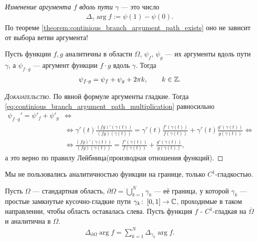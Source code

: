 \documentclass[../complex-analysis.tex]{subfiles}
\begin{document}
\begin{df}
 \textit{Изменение аргумента $ f $ вдоль пути $ \gamma $}  --- это число
 \begin{align*}
  \Delta_\gamma \arg f := \psi(1) - \psi(0).
\end{align*} По теореме \eqref{theorem:continious_branch_argument_path_exists} оно не зависит от выбора ветви аргумента!
\end{df}
\begin{remrk}
 Пусть функции $ f,g $ аналитичны в области $ \Omega  $, $ \psi_f $, $ \psi_g $ --- их аргументы вдоль пути $ \gamma $, а $ \psi_{f\cdot g} $ --- аргумент функции $ f \cdot g $ вдоль $ \gamma $. Тогда
 \begin{align}
	 \psi_{f\cdot g} = \psi_f + \psi_g + 2\pi k, \qquad k \in \mathbb{Z}. \label{eq:continious_branch_argument_path_multiplication}
 \end{align}
\end{remrk}
\begin{proof}[\normalfont\textsc{Доказательство}]
По явной формуле аргументы гладкие. Тогда \eqref{eq:continious_branch_argument_path_multiplication} равносильно
 \begin{align*}
  \psi_{f \cdot g}'  = \psi'_f + \psi'_g &\iff \\
  &\iff \gamma'(t) \frac{(fg)'(\gamma(t))}{(fg)(\gamma(t))} = \gamma'(t) \frac{f'(\gamma(t))}{f(\gamma(t))} +  \gamma'(t)\frac{g'(\gamma(t))}{g(\gamma(t))} \iff \\
  &\iff \frac{(fg)'(\gamma(t))}{(fg)(\gamma(t))} = \frac{f'(\gamma(t))}{f(\gamma(t))} + \frac{g'(\gamma(t))}{g(\gamma(t))},
 \end{align*} а это верно по правилу Лейбница(производная отношения функций).
\end{proof}

\begin{remrk*}
 Мы не пользовались аналитичностью функции на границе, только $ C^{1} $-гладкостью.
\end{remrk*}

\begin{df}
 Пусть $ \Omega $ --- стандартная область, $ \partial \Omega  = \bigcup_{k=1}^{N} \gamma_k $  --- её граница, у которой $ \gamma_k $ --- простые замкнутые кусочно-гладкие пути  $ \gamma_k \colon\, [0,1] \to \mathbb{C} $, проходимые в таком направлении, чтобы область оставалась слева. Пусть функция $ f $ - $ C^{1} $-гладкая на $ \overline \Omega $ и аналитична в $ \Omega $.
 \begin{align*}
  \Delta_{\partial \Omega} \arg f = \sum_{k=1}^{N}\Delta_{\gamma_k} \arg f.
 \end{align*}
\end{df}
\end{document}
